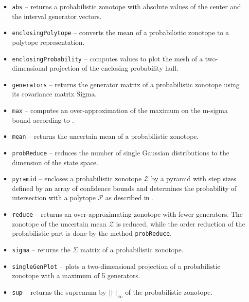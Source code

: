 \begin{itemize}
    \item \texttt{abs} -- returns a probabilistic zonotope with absolute values of the center and the interval generator vectors.
    \item \texttt{enclosingPolytope} -- converts the mean of a probabilistic zonotope to a polytope representation.
    \item \texttt{enclosingProbability} -- computes values to plot the mesh of a two-dimensional projection of the enclosing probability hull.
    \item \texttt{generators} -- returns the generator matrix of a probabilistic zonotope using its covariance matrix Sigma.
    \item \texttt{max} -- computes an over-approximation of the maximum on the m-sigma bound according to \cite[Equation 3]{Althoff2009d}.
    \item \texttt{mean} -- returns the uncertain mean of a probabilistic zonotope.
    \item \texttt{probReduce} -- reduces the number of single Gaussian distributions to the dimension of the state space.
    \item \texttt{pyramid} -- encloses a probabilistic zonotope $\mathscr{Z}$ by a pyramid with step sizes defined by an array of confidence bounds and determines the probability of intersection with a polytope $\mathcal{P}$ as described in \cite[Section VI.C]{Althoff2009d}.
    \item \texttt{reduce} -- returns an over-approximating zonotope with fewer generators. The zonotope of the uncertain mean $\mathcal{Z}$ is reduced, while the order reduction of the probabilistic part is done by the method \texttt{probReduce}.
    \item \texttt{sigma} -- returns the $\Sigma$ matrix of a probabilistic zonotope.
    \item \texttt{singleGenPlot} -- plots a two-dimensional projection of a probabilistic zonotope with a maximum of 5 generators.
    \item \texttt{sup} -- returns the supremum by $\lvert| \cdot |\rvert_\infty$ of the probabilistic zonotope.
\end{itemize}



